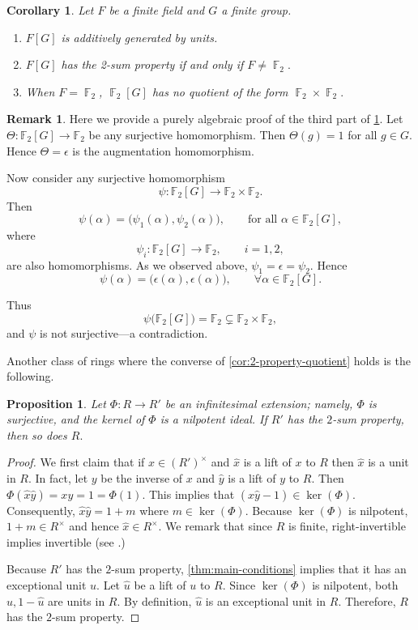 \documentclass[11pt, a4paper]{amsart}
\newtheorem{prop}[thm]{Proposition}
\newtheorem{cor}[thm]{Corollary}
\theoremstyle{definition}
\newtheorem{rem}[thm]{Remark}
\DeclareMathOperator{\F}{\mathbb{F}}
\numberwithin{equation}{section}
\begin{document}
\begin{cor} \label{cor:F[G]}
    Let $F$ be a finite field and $G$ a finite group. 
    \begin{enumerate}
        \item  $F[G]$ is additively generated by units. 
        \item $F[G]$ has the 2-sum property if and only if $F \neq \F_2.$
        \item When $F=\F_2$, $\F_2[G]$ has no quotient of the form $\F_2 \times \F_2.$
    \end{enumerate}
\end{cor}
\begin{rem}
Here we provide a purely algebraic proof of the third part of \cref{cor:F[G]}. Let
$\Theta : \mathbb{F}_2[G] \longrightarrow \mathbb{F}_2$
be any surjective homomorphism. Then $\Theta(g)=1$ for all $g \in G$. Hence $\Theta=\epsilon$ is the augmentation homomorphism.

Now consider any surjective homomorphism
\[
\psi : \mathbb{F}_2[G] \longrightarrow \mathbb{F}_2 \times \mathbb{F}_2.
\]
Then
\[
\psi(\alpha) = \bigl(\psi_1(\alpha),\psi_2(\alpha)\bigr),
\qquad \text{for all } \alpha \in \mathbb{F}_2[G],
\]
where
\[
\psi_i : \mathbb{F}_2[G] \longrightarrow \mathbb{F}_2,
\qquad i=1,2,
\]
are also homomorphisms. As we observed above, $\psi_1=\epsilon=\psi_2.$ Hence
\[
\psi(\alpha)=\bigl(\epsilon(\alpha),\epsilon(\alpha)\bigr),
\qquad \forall \alpha \in \mathbb{F}_2[G].
\]

Thus
\[
\psi\bigl(\mathbb{F}_2[G]\bigr)
=
\mathbb{F}_2
\subsetneq
\mathbb{F}_2 \times \mathbb{F}_2,
\]
and $\psi$ is not surjective---a contradiction.
\end{rem}

Another class of rings where the converse of \cref{cor:2-property-quotient} holds is the following.
\begin{prop}
    Let $\Phi\colon R \to R'$ be an infinitesimal extension; namely, $\Phi$ is surjective, and the kernel of $\Phi$ is a nilpotent ideal. If $R'$ has the $2$-sum property, then so does $R.$
\end{prop}

\begin{proof}
We first claim that if $x \in (R')^{\times}$ and $\widehat{x}$ is a lift of $x$ to $R$ then $\widehat{x}$ is a unit in $R.$ In fact, let $y$ be the inverse of $x$ and $\widehat{y}$ is a lift of $y$ to $R$. Then $\Phi(\widehat{x} \widehat{y})=xy=1=\Phi(1).$ This implies that $(\widehat{x} \widehat{y} -1) \in \ker(\Phi)$. Consequently, $\widehat{x} \widehat{y} = 1 + m$ where $m \in \ker(\Phi)$. Because $\ker(\Phi)$ is nilpotent, $1+m \in R^{\times}$ and hence $\widehat{x} \in R^{\times}$. We remark that since $R$ is finite, right-invertible implies invertible (see \cite[Proposition 2.1]{perfect-unitary}.)

    Because $R'$ has the $2$-sum property, \cref{thm:main-conditions} implies that it has an exceptional unit $u$. Let $\widehat{u}$ be a lift of $u$ to $R.$ Since $\ker(\Phi)$ is nilpotent, both $\widehat{u}, 1-\widehat{u}$ are units in $R.$ By definition, $\widehat{u}$ is an exceptional unit in $R.$ Therefore, $R$ has the $2$-sum property. 
\end{proof}
\end{document}
